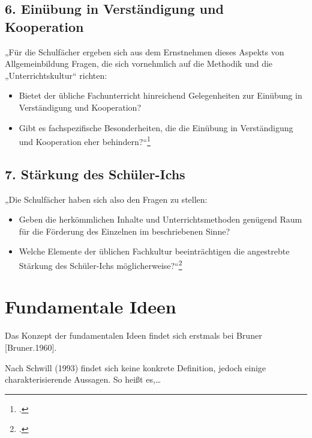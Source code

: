 \documentclass{lehramt-informatik-haupt}
\begin{document}
%

\subsection{6. Einübung in Verständigung und Kooperation}

„Für die Schulfächer ergeben sich aus dem Ernstnehmen dieses Aspekts von
Allgemeinbildung Fragen, die sich vornehmlich auf die Methodik und die
„Unterrichtskultur“ richten:

\begin{itemize}
\item Bietet der übliche Fachunterricht hinreichend Gelegenheiten zur
Einübung in Verständigung und Kooperation?

\item Gibt es fachspezifische Besonderheiten, die die Einübung in
Verständigung und Kooperation eher behindern?“\footcite[Seite 10]{ddi:fs:1}
\end{itemize}

%

\subsection{7. Stärkung des Schüler-Ichs}

„Die Schulfächer haben sich also den Fragen zu stellen:

\begin{itemize}
\item Geben die herkömmlichen Inhalte und Unterrichtsmethoden genügend
Raum für die Förderung des Einzelnen im beschriebenen Sinne?

\item Welche Elemente der üblichen Fachkultur beeinträchtigen die
angestrebte Stärkung des Schüler-Ichs möglicherweise?“\footcite[Seite 11]{ddi:fs:1}
\end{itemize}

%

\section{Fundamentale Ideen}

Das Konzept der fundamentalen Ideen findet sich erstmals bei Bruner
[Bruner.1960].

Nach Schwill (1993) findet sich keine konkrete Definition, jedoch einige
charakterisierende Aussagen. So heißt es,…
\end{document}
